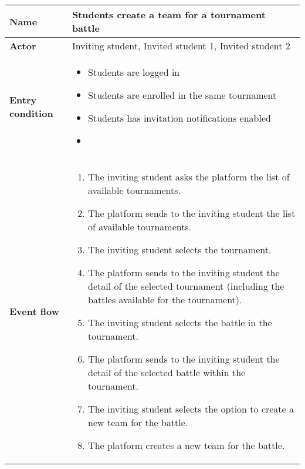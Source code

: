 \begin{enumerate}[label=\textbf{UC\arabic*}:,ref=UC\arabic*,leftmargin=1.3cm]
{\begin{table}[H]
\begin{tabular}{|l|p{11.9cm}|}
                        \hline
                        \textbf{Name}            & Students create a team for a tournament battle                                                                            \\\hline
                        \textbf{Actor}           & Inviting student, Invited student 1, Invited student 2                                                                    \\\hline
                        \textbf{Entry condition} &
                        \begin{itemize}
                              \item Students are logged in
                              \item Students are enrolled in the same tournament
                              \item Students has invitation notifications enabled
                              \item
                        \end{itemize}                                                                                                   \\\hline
                        \textbf{Event flow}      &
                        \begin{enumerate}[label=\arabic*.]
                              \item The inviting student asks the platform the list of available tournaments.
                              \item The platform sends to the inviting student the list of available tournaments.
                              \item The inviting student selects the tournament.
                              \item The platform sends to the inviting student the detail of the selected tournament (including the battles available for the tournament).
                              \item The inviting student selects the battle in the tournament.
                              \item The platform sends to the inviting student the detail of the selected battle within the tournament.
                              \item The inviting student selects the option to create a new team for the battle.
                              \item The platform creates a new team for the battle.

\end{enumerate}
\end{tabular}
\end{table}}
\end{enumerate}
